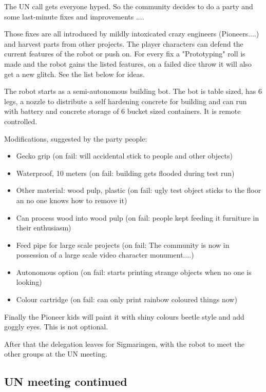 The UN call gets everyone hyped. So the community decides to do a party and some last-minute fixes and improvements ....

Those fixes are all introduced by mildly intoxicated crazy engineers (Pioneers....) and harvest parts from other projects. The player characters can defend the current features of the robot or push on. For every fix a "Prototyping" roll is made and the robot gains the listed features, on a failed dice throw it will also get a new glitch. See the list below for ideas.

The robot starts as a semi-autonomous building bot. The bot is table sized, has 6 legs, a nozzle to distribute a self hardening concrete for building and can run with battery and concrete storage of 6 bucket sized containers. It is remote controlled.

Modifications, suggested by the party people:

\begin{itemize}
    \item Gecko grip (on fail: will accidental stick to people and other objects)
    \item Waterproof, 10 meters (on fail: building gets flooded during test run)
    \item Other material: wood pulp, plastic (on fail: ugly test object sticks to the floor an no one knows how to remove it)
    \item Can process wood into wood pulp (on fail: people kept feeding it furniture in their enthusiasm)
    \item Feed pipe for large scale projects (on fail: The community is now in possession of a large scale video character monument....)
    \item Autonomous option (on fail: starts printing strange objects when no one is looking)
    \item Colour cartridge (on fail: can only print rainbow coloured things now)
\end{itemize}

Finally the Pioneer kids will paint it with shiny colours beetle style and add goggly eyes. This is not optional.

After that the delegation leaves for Sigmaringen, with the robot to meet the other groups at the UN meeting.

\subsection{UN meeting continued}

